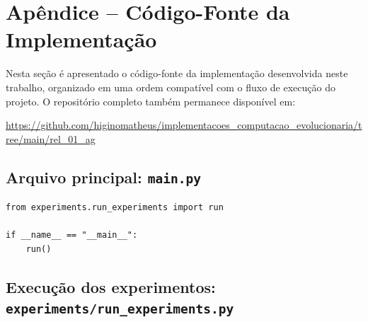 \documentclass[a4paper,12pt]{article}
\begin{document}
\newpage
\appendix
\section{Apêndice -- Código-Fonte da Implementação}

Nesta seção é apresentado o código-fonte da implementação desenvolvida neste trabalho, organizado em uma ordem compatível com o fluxo de execução do projeto. O repositório completo também permanece disponível em:
\begin{center}
\url{https://github.com/higinomatheus/implementacoes_computacao_evolucionaria/tree/main/rel_01_ag}
\end{center}

\subsection{Arquivo principal: \texttt{main.py}}

\begin{lstlisting}[caption={main.py}]
from experiments.run_experiments import run

if __name__ == "__main__":
    run()
\end{lstlisting}

\newpage
\subsection{Execução dos experimentos: \texttt{experiments/run\_experiments.py}}
\end{document}
